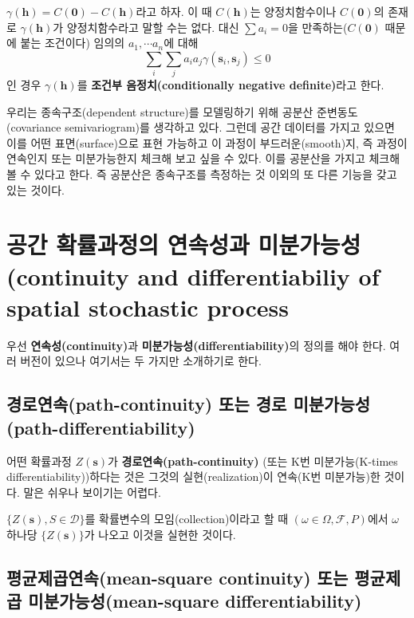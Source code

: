 \documentclass[b5paper,]{scrbook}
\theoremstyle{plain}
\theoremstyle{definition}
\numberwithin{equation}{section}
\begin{document}
\(\gamma(\mathbf{h})=C(\mathbf{0})-C(\mathbf{h})\)라고 하자. 이 때
\(C(\mathbf{h})\)는 양정치함수이나 \(C(\mathbf{0})\)의 존재로
\(\gamma(\mathbf{h})\)가 양정치함수라고 말할 수는 없다. 대신
\(\sum a_{i}=0\)을 만족하는(\(C(\mathbf{0})\) 때문에 붙는 조건이다)
임의의 \(a_{1}, \cdots a_{n}\)에 대해
\[\sum_{i}\sum_{j}a_{i}a_{j}\gamma(\mathbf{s}_{i},\mathbf{s}_{j}) \leq 0\]
인 경우 \(\gamma(\mathbf{h})\)를 \textbf{조건부 음정치(conditionally
negative definite)}라고 한다.

우리는 종속구조(dependent structure)를 모델링하기 위해 공분산
준변동도(covariance semivariogram)를 생각하고 있다. 그런데 공간 데이터를
가지고 있으면 이를 어떤 표면(surface)으로 표현 가능하고 이 과정이
부드러운(smooth)지, 즉 과정이 연속인지 또는 미분가능한지 체크해 보고
싶을 수 있다. 이를 공분산을 가지고 체크해 볼 수 있다고 한다. 즉 공분산은
종속구조를 측정하는 것 이외의 또 다른 기능을 갖고 있는 것이다.

\section{공간 확률과정의 연속성과 미분가능성(continuity and
differentiabiliy of spatial stochastic
process}\label{---continuity-and-differentiabiliy-of-spatial-stochastic-process}

우선 \textbf{연속성(continuity)}과
\textbf{미분가능성(differentiability)}의 정의를 해야 한다. 여러 버전이
있으나 여기서는 두 가지만 소개하기로 한다.

\subsection{경로연속(path-continuity) 또는 경로
미분가능성(path-differentiability)}\label{path-continuity---path-differentiability}

어떤 확률과정 \(Z(\mathbf{s})\)가 \textbf{경로연속(path-continuity)}
(또는 K번 미분가능(K-times differentiability))하다는 것은 그것의
실현(realization)이 연속(K번 미분가능)한 것이다. 말은 쉬우나 보이기는
어렵다.

\(\{ Z(\mathbf{s}) , S \in \mathcal{D}\}\)를 확률변수의
모임(collection)이라고 할 때 \((\omega \in \Omega, \mathcal{F}, P)\)에서
\(\omega\) 하나당 \(\{ Z(\mathbf{s})\}\)가 나오고 이것을 실현한 것이다.

\subsection{평균제곱연속(mean-square continuity) 또는 평균제곱
미분가능성(mean-square
differentiability)}\label{mean-square-continuity---mean-square-differentiability}
\end{document}

